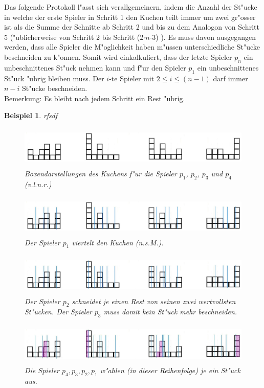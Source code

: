 \documentclass[11pt, a4paper, twoside]{article}
\newcommand{\wf}{\color{white}}
\newtheorem{bsp}[satz]{Beispiel}
\numberwithin{equation}{section}
\begin{document}
\newline
\newline
\newline
Das folgende Protokoll l"asst sich verallgemeinern, indem die Anzahl der St"ucke in welche der erste Spieler in Schritt 1 den Kuchen teilt immer um zwei gr"osser ist als die Summe der Schnitte ab Schritt 2 und bis zu dem Analogon von Schritt 5 ("ublicherweise von Schritt 2 bis Schritt (2$\cdot n$-3) ). Es muss davon ausgegangen werden, dass alle Spieler die M"oglichkeit haben m"ussen unterschiedliche St"ucke beschneiden zu k"onnen. Somit wird einkalkuliert, dass der letzte Spieler $p_n$ ein unbeschnittenes St"uck nehmen kann und f"ur den Spieler $p_1$ ein unbeschnittenes St"uck "ubrig bleiben muss. Der $i$-te Spieler mit $2 \leq i \leq (n-1)$ darf immer $n-i$ St"ucke beschneiden.\\
Bemerkung: Es bleibt nach jedem Schritt ein Rest "ubrig.
\begin{bsp}\wf rfsdf
\begin{figure}[h!]
\includegraphics[height=2cm]{upfv.jpg}
\caption[Beispiel zum unendlichen Protokoll 1/4]{Boxendarstellungen des Kuchens f"ur die Spieler $p_1$, $p_2$, $p_3$ und $p_4$ (v.l.n.r.)}
\end{figure}
\begin{figure}[h!]
\includegraphics[height=2cm]{upfv2.jpg}
\caption[Beispiel zum unendlichen Protokoll 2/4]{Der Spieler $p_1$ viertelt den Kuchen (n.s.M.).}
\end{figure}
\begin{figure}[h!]
\includegraphics[height=2cm]{upfv3.jpg}
\caption[Beispiel zum unendlichen Protokoll 3/4]{Der Spieler $p_2$ schneidet je einen Rest von seinen zwei wertvollsten St"ucken. Der Spieler $p_3$ muss damit kein St"uck mehr beschneiden.}
\end{figure}
\begin{figure}[h!]
\includegraphics[height=2cm]{upfv5.jpg}
\caption[Beispiel zum unendlichen Protokoll 4/4]{Die Spieler $p_4,p_3,p_2,p_1$ w"ahlen (in dieser Reihenfolge) je ein St"uck aus.}
\end{figure}
\end{bsp}\newpage
\end{document}
